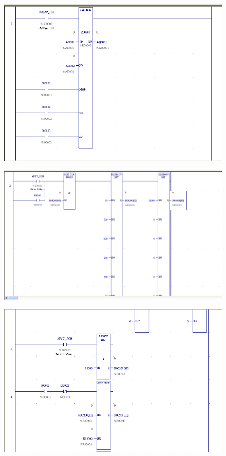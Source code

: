 \documentclass[12pt]{article}
\begin{document}
\begin{figure}[H]
    \centering
    \includegraphics[width = \textwidth]{./zdj/network1.png}
\end{figure}
\begin{figure}[H]
    \centering
    \includegraphics[width = \textwidth]{./zdj/network2.png}
\end{figure}
\begin{figure}[H]
    \centering
    \includegraphics[width = \textwidth]{./zdj/network3.png}
\end{figure}
\end{document}

